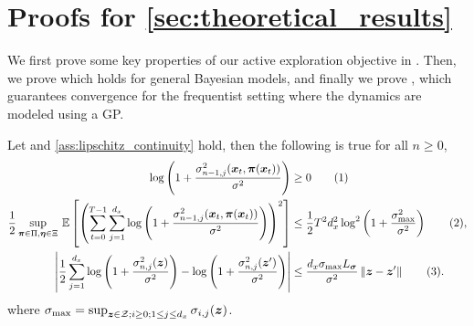 \section{Proofs for \cref{sec:theoretical_results}} \label{sec:proofs}
We first prove some key properties of our active exploration objective in . Then, we prove  which holds for general Bayesian models, and finally we prove , which guarantees convergence for the frequentist setting where the dynamics are modeled using a GP. 
\begin{lemma}
\label{cor:bounded_objective}
Let  and \ref{ass:lipschitz_continuity} hold, then the following is true for all $n\geq 0$,
\begin{align*}
     \log \left(1 + \frac{\sigma_{n-1, j}^2({\bm{x}}_t, {\bm{\pi}}({\bm{x}}_t))}{\sigma^2}\right) &\ge 0 \tag{1} \\
     \frac{1}{2}\sup_{{\bm{\pi}} \in \Pi, {\bm{\eta}} \in \Xi} \hspace{0.2em} \mathbb{E}\left[\left(\sum_{t=0}^{T-1} \sum^{d_x}_{j=1} \log \left(1 + \frac{\sigma_{n-1, j}^2({\bm{x}}_t, {\bm{\pi}}({\bm{x}}_t))}{\sigma^2}\right)\right)^2\right] &\leq \frac{1}{2} T^2 d^2_x \log^2 \left(1 + \frac{\sigma^2_{\max}}{\sigma^2}\right) \tag{2}, \\
      \left\vert \frac{1}{2}\sum^{d_x}_{j=1} \log \left(1 + \frac{\sigma_{n, j}^2({\bm{z}})}{\sigma^{2}}\right) - \log \left(1 + \frac{\sigma_{n, j}^2({\bm{z}}')}{\sigma^{2}}\right) \right\vert &\leq \frac{d_x\sigma_{\max} L_{{\bm{\sigma}}}}{\sigma^2} \left\lVert{\bm{z}} - {\bm{z}}'\right\rVert \tag{3}.
\end{align*}
where $\sigma_{\max} = \sup_{{\bm{z}} \in {\mathcal{Z}}; i \geq 0; 1\leq j\leq d_x} \sigma_{i, j}({\bm{z}})$.
\end{lemma}
